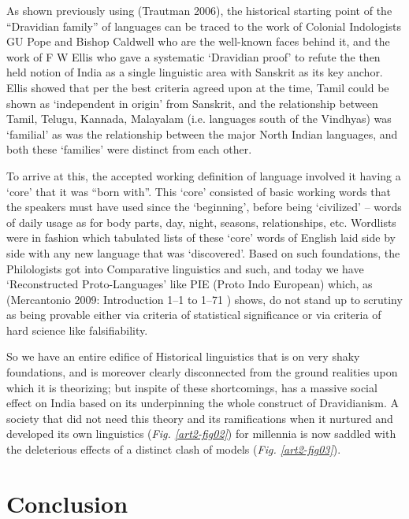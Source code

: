 As shown previously using (Trautman 2006), the historical starting point of the “Dravidian family” of languages can be traced to the work of Colonial Indologists GU Pope and Bishop Caldwell who are the well-known faces behind it, and the work of F W Ellis who gave a systematic ‘Dravidian proof’ to refute the then held notion of India as a single linguistic area with Sanskrit as its key anchor. Ellis showed that per the best criteria agreed upon at the time, Tamil could be shown as ‘independent in origin’ from Sanskrit, and the relationship between Tamil, Telugu, Kannada, Malayalam (i.e. languages south of the Vindhyas) was ‘familial’ as was the relationship between the major North Indian languages, and both these ‘families’ were distinct from each other.

To arrive at this, the accepted working definition of language involved it having a ‘core’ that it was “born with”. This ‘core’ consisted of basic working words that the speakers must have used since the ‘beginning’, before being ‘civilized’ – words of daily usage as for body parts, day, night, seasons, relationships, etc. Wordlists were in fashion which tabulated lists of these ‘core’ words of English laid side by side with any new language that was ‘discovered’. Based on such foundations, the Philologists got into Comparative linguistics and such, and today we have ‘Reconstructed Proto-Languages’ like PIE (Proto Indo European) which, as (Mercantonio 2009: Introduction 1–1 to 1–71 ) shows, do not stand up to scrutiny as being provable either via criteria of statistical significance or via criteria of hard science like falsifiability.

So we have an entire edifice of Historical linguistics that is on very shaky foundations, and is moreover clearly disconnected from the ground realities upon which it is theorizing; but inspite of these shortcomings, has a massive social effect on India based on its underpinning the whole construct of Dravidianism. A society that did not need this theory and its ramifications when it nurtured and developed its own linguistics (\textit{Fig. \ref{art2-fig02}}) for millennia is now saddled with the deleterious effects of a distinct clash of models (\textit{Fig. \ref{art2-fig03}}).



\section*{Conclusion}

\vskip -5pt

